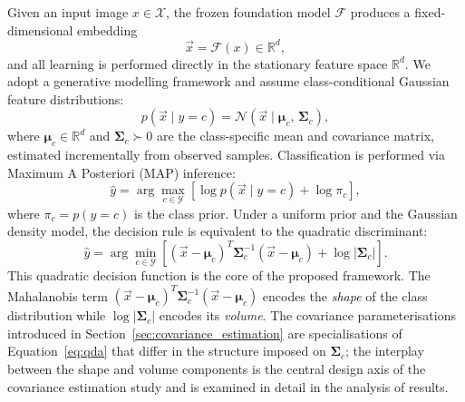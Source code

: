 Given an input image $x \in \mathcal{X}$, the frozen foundation model $\mathcal{F}$ produces a fixed-dimensional embedding
\begin{equation}
    \vec{x} = \mathcal{F}(x) \in \mathbb{R}^d,
    \label{eq:feature_extractor}
\end{equation}
and all learning is performed directly in the stationary feature space $\mathbb{R}^d$. We adopt a generative modelling framework and assume class-conditional Gaussian feature distributions:
\begin{equation}
    p(\vec{x} \mid y = c) = \mathcal{N}(\vec{x} \mid \boldsymbol{\mu}_c,\, \boldsymbol{\Sigma}_c),
    \label{eq:class_gaussian}
\end{equation}
where $\boldsymbol{\mu}_c \in \mathbb{R}^d$ and $\boldsymbol{\Sigma}_c \succ 0$ are the class-specific mean and covariance matrix, estimated incrementally from observed samples. Classification is performed via Maximum A Posteriori (MAP) inference:
\begin{equation}
    \hat{y} = \arg\max_{c \in \mathcal{Y}} \left[ \log p(\vec{x} \mid y=c) + \log \pi_c \right],
    \label{eq:map}
\end{equation}
where $\pi_c = p(y=c)$ is the class prior. Under a uniform prior and the Gaussian density model, the decision rule is equivalent to the quadratic discriminant:
\begin{equation}
    \hat{y} = \arg\min_{c \in \mathcal{Y}} \left[ (\vec{x} - \boldsymbol{\mu}_c)^T \boldsymbol{\Sigma}_c^{-1} (\vec{x} - \boldsymbol{\mu}_c) + \log|\boldsymbol{\Sigma}_c| \right].
    \label{eq:qda}
\end{equation}
This quadratic decision function is the core of the proposed framework. The Mahalanobis term $(\vec{x}-\boldsymbol{\mu}_c)^T\boldsymbol{\Sigma}_c^{-1}(\vec{x}-\boldsymbol{\mu}_c)$ encodes the \emph{shape} of the class distribution while $\log|\boldsymbol{\Sigma}_c|$ encodes its \emph{volume}. The covariance parameterisations introduced in Section~\ref{sec:covariance_estimation} are specialisations of Equation~\eqref{eq:qda} that differ in the structure imposed on $\boldsymbol{\Sigma}_c$; the interplay between the shape and volume components is the central design axis of the covariance estimation study and is examined in detail in the analysis of results.

